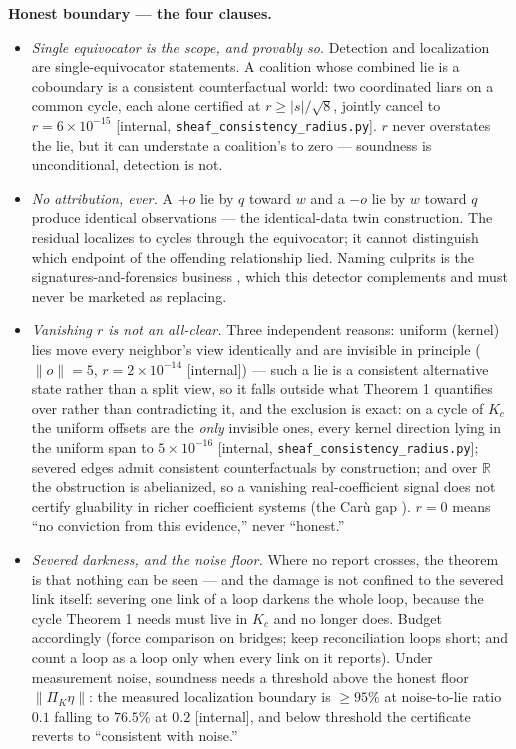 \documentclass[11pt,a4paper]{article}
\begin{document}
\begin{boundary}
\textbf{Honest boundary --- the four clauses.}
\begin{itemize}
\item \emph{Single equivocator is the scope, and provably so.} Detection and localization are single-equivocator
statements. A coalition whose combined lie is a coboundary is a consistent counterfactual world: two coordinated liars on
a common cycle, each alone certified at $r\ge|s|/\sqrt8$, jointly cancel to $r=6\times10^{-15}$
[internal, \texttt{sheaf\_consistency\_radius.py}]. $r$ never overstates the lie, but it can understate a coalition's to
zero --- soundness is unconditional, detection is not.
\item \emph{No attribution, ever.} A $+o$ lie by $q$ toward $w$ and a $-o$ lie by $w$ toward $q$ produce identical
observations --- the identical-data twin construction. The residual localizes to cycles through the equivocator; it cannot
distinguish which endpoint of the offending relationship lied. Naming culprits is the signatures-and-forensics business
\cite{sheng}, which this detector complements and must never be marketed as replacing.
\item \emph{Vanishing $r$ is not an all-clear.} Three independent reasons: uniform (kernel) lies move every neighbor's
view identically and are invisible in principle ($\|o\|=5$, $r=2\times10^{-14}$ [internal]) --- such a lie is a consistent
alternative state rather than a split view, so it falls outside what Theorem 1 quantifies over rather than contradicting it,
and the exclusion is exact: on a cycle of $K_c$ the uniform offsets are the \emph{only} invisible ones, every kernel
direction lying in the uniform span to $5\times10^{-16}$
[internal, \texttt{sheaf\_consistency\_radius.py}]; severed edges admit
consistent counterfactuals by construction; and over $\mathbb{R}$ the obstruction is abelianized, so a vanishing
real-coefficient signal does not certify gluability in richer coefficient systems (the Car\`u gap \cite{caru}). $r=0$
means ``no conviction from this evidence,'' never ``honest.''
\item \emph{Severed darkness, and the noise floor.} Where no report crosses, the theorem is that nothing can be seen ---
and the damage is not confined to the severed link itself: severing one link of a loop darkens the whole loop, because the
cycle Theorem 1 needs must live in $K_c$ and no longer does. Budget accordingly (force comparison on bridges; keep
reconciliation loops short; and count a loop as a loop only when every link on it reports). Under measurement noise, soundness
needs a threshold above the honest floor $\|\Pi_K\eta\|$: the measured localization boundary is $\ge95\%$ at noise-to-lie
ratio $0.1$ falling to $76.5\%$ at $0.2$ [internal], and below threshold the certificate reverts to ``consistent with
noise.''
\end{itemize}
\end{boundary}
\end{document}
